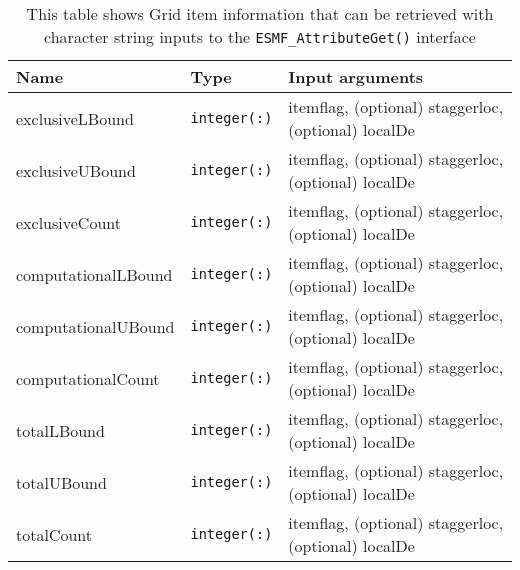 \begin{table}[h!p!b!]
  \caption{This table shows Grid item information that can be retrieved with character string inputs to the {\tt ESMF\_AttributeGet()} interface}
  \begin{tabular}{|l|l|l|}
    \hline
    {\bf Name} & {\bf Type} & {\bf Input arguments}\\
    \hline
    exclusiveLBound & {\tt integer(:)} & itemflag, (optional) staggerloc, (optional) localDe\\
    exclusiveUBound & {\tt integer(:)} & itemflag, (optional) staggerloc, (optional) localDe\\
    exclusiveCount & {\tt integer(:)} & itemflag, (optional) staggerloc, (optional) localDe\\
    computationalLBound & {\tt integer(:)} & itemflag, (optional) staggerloc, (optional) localDe\\
    computationalUBound & {\tt integer(:)} & itemflag, (optional) staggerloc, (optional) localDe\\
    computationalCount & {\tt integer(:)} & itemflag, (optional) staggerloc, (optional) localDe\\
    totalLBound & {\tt integer(:)} & itemflag, (optional) staggerloc, (optional) localDe\\
    totalUBound & {\tt integer(:)} & itemflag, (optional) staggerloc, (optional) localDe\\
    totalCount & {\tt integer(:)} & itemflag, (optional) staggerloc, (optional) localDe\\
    \hline
  \end{tabular}
  \label{AttributeInternalInfo-Item}
\end{table}

\vspace{.20in}

